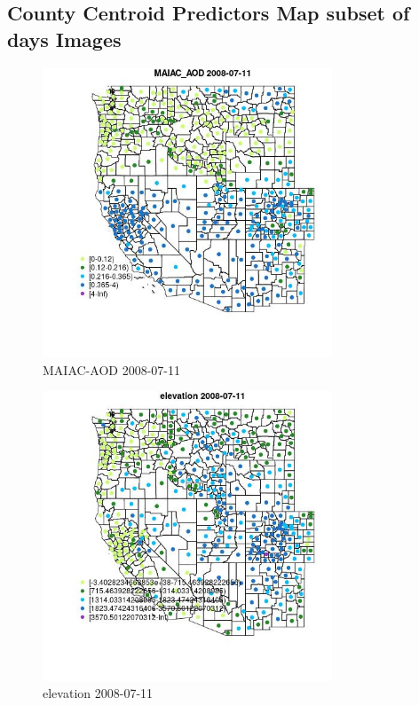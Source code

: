 
\subsection{County Centroid Predictors Map subset of days Images} 
 

\begin{figure} 
\centering  
\includegraphics[width=0.77\textwidth]{Code_Outputs/df_report_ML_predictors_CountyCentroid_Locations_Dates_2008-01-01to2018-12-31_MapObsMAIAC_AOD2008-07-11.jpg} 
\caption{\label{fig:df_report_ML_predictors_CountyCentroid_Locations_Dates_2008-01-01to2018-12-31MapObsMAIAC_AOD2008-07-11}MAIAC-AOD 2008-07-11} 
\end{figure} 
 

\begin{figure} 
\centering  
\includegraphics[width=0.77\textwidth]{Code_Outputs/df_report_ML_predictors_CountyCentroid_Locations_Dates_2008-01-01to2018-12-31_MapObselevation2008-07-11.jpg} 
\caption{\label{fig:df_report_ML_predictors_CountyCentroid_Locations_Dates_2008-01-01to2018-12-31MapObselevation2008-07-11}elevation 2008-07-11} 
\end{figure} 
 

